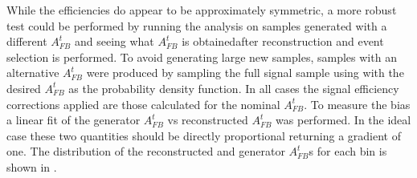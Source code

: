 While the efficiencies do appear to be approximately symmetric, a more robust test could be performed by running the analysis on samples generated with a different $A_{FB}^t$ and seeing what $A_{FB}^t$ is obtainedafter reconstruction and event selection is performed. To avoid generating large new samples, samples with an alternative $A_{FB}^t$ were produced by sampling the full signal sample using  with the desired $A_{FB}^t$ as the probability density function. In all cases the signal efficiency corrections applied are those calculated for the nominal $A_{FB}^t$. To measure the bias a linear fit of the generator $A_{FB}^t$ vs reconstructed $A_{FB}^t$ was performed. In the ideal case these two quantities should be directly proportional returning a gradient of one. The distribution of the reconstructed and generator $A_{FB}^t$s for each bin is shown in .

